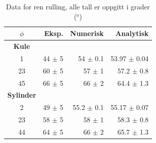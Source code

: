 \documentclass[5p]{elsarticle}
\begin{document}
	\begin{table}[H]
		\begin{center}
			\caption{Data for ren rulling, alle tall er oppgitt i grader ($^{\text{o}}$)}
			\label{rrull}	%
			\vspace{0.5cm}					%
			\begin{tabular}{|crrr|} 		%
				\hline		%
				$\phi$  &  Eksp. & Numerisk & Analytisk\\  			%
				\hline \hline
				\textbf{Kule} & & & \\
				1   &  44 $\pm$ 5  &  54 $\pm$ 0.1  &  53.97 $\pm$ 0.04  \\
				23  &  60 $\pm$ 5  &  57 $\pm$ 1  &  57.2 $\pm$ 0.8   \\
				45  &  66 $\pm$ 5  &  66 $\pm$ 2  &  64.4 $\pm$ 1.3  \\
				\hline \hline
				\textbf{Sylinder} & & & \\
				2   &  49 $\pm$ 5  &  55.2 $\pm$ 0.1   &  55.17 $\pm$ 0.07  \\ 
				23  &  58 $\pm$ 5  &  58 $\pm$ 1   &  58.3 $\pm$ 0.8  \\
				44  &  64 $\pm$ 5  &  66 $\pm$ 2  &  65.7 $\pm$ 1.3  \\
				\hline
			\end{tabular}
		\end{center}
	\end{table}
	
\end{document}
